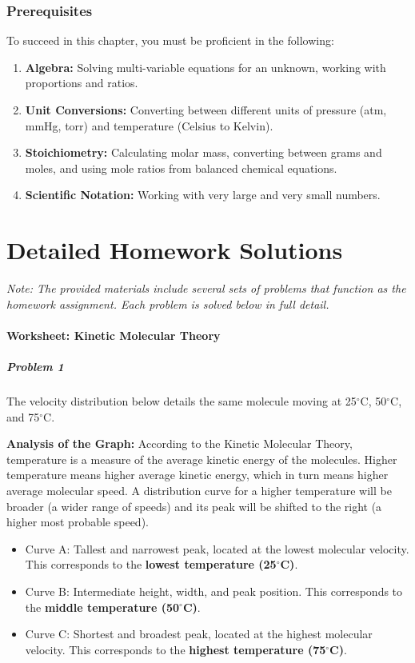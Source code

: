 \documentclass{article}
\begin{document}
\section{Prerequisites}
To succeed in this chapter, you must be proficient in the following:
\begin{enumerate}
    \item \textbf{Algebra:} Solving multi-variable equations for an unknown, working with proportions and ratios.
    \item \textbf{Unit Conversions:} Converting between different units of pressure (atm, mmHg, torr) and temperature (Celsius to Kelvin).
    \item \textbf{Stoichiometry:} Calculating molar mass, converting between grams and moles, and using mole ratios from balanced chemical equations.
    \item \textbf{Scientific Notation:} Working with very large and very small numbers.
\end{enumerate}

\part{Detailed Homework Solutions}
\textit{Note: The provided materials include several sets of problems that function as the homework assignment. Each problem is solved below in full detail.}

\subsection{Worksheet: Kinetic Molecular Theory}

\subsubsection{Problem 1}
The velocity distribution below details the same molecule moving at 25$^{\circ}$C, 50$^{\circ}$C, and 75$^{\circ}$C.

\textbf{Analysis of the Graph:}
According to the Kinetic Molecular Theory, temperature is a measure of the average kinetic energy of the molecules. Higher temperature means higher average kinetic energy, which in turn means higher average molecular speed. A distribution curve for a higher temperature will be broader (a wider range of speeds) and its peak will be shifted to the right (a higher most probable speed).
\begin{itemize}
    \item Curve A: Tallest and narrowest peak, located at the lowest molecular velocity. This corresponds to the \textbf{lowest temperature (25$^{\circ}$C)}.
    \item Curve B: Intermediate height, width, and peak position. This corresponds to the \textbf{middle temperature (50$^{\circ}$C)}.
    \item Curve C: Shortest and broadest peak, located at the highest molecular velocity. This corresponds to the \textbf{highest temperature (75$^{\circ}$C)}.
\end{itemize}
\end{document}
